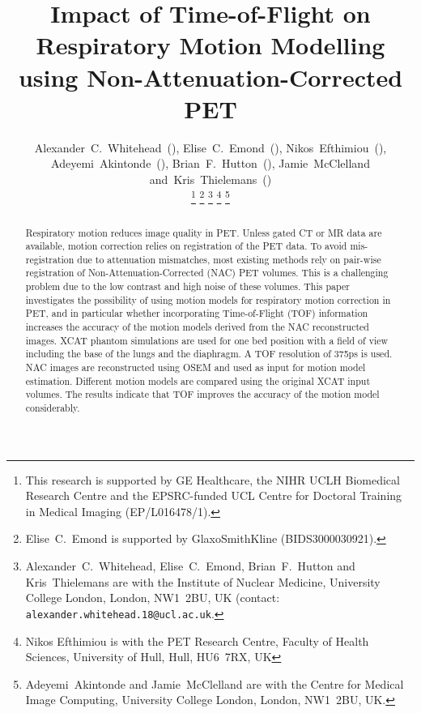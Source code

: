 \documentclass{IEEEtran}
\begin{document}
\title{Impact of Time-of-Flight on Respiratory Motion Modelling using Non-Attenuation-Corrected PET}

\author{Alexander~C.~Whitehead~(),
        Elise~C.~Emond~(),
        Nikos~Efthimiou~(),
        Adeyemi~Akintonde~(),
        Brian~F.~Hutton~(),
        Jamie~McClelland
        and~Kris~Thielemans~()%
        
    \vspace{-0.5cm}

    \thanks{This research is supported by GE Healthcare, the NIHR UCLH Biomedical Research Centre and the EPSRC-funded UCL Centre for Doctoral Training in Medical Imaging (EP/L016478/1).}%
    \thanks{Elise~C.~Emond is supported by GlaxoSmithKline (BIDS3000030921).}%
    \thanks{Alexander~C.~Whitehead, Elise~C.~Emond, Brian~F.~Hutton and Kris~Thielemans are with the Institute of Nuclear Medicine, University College London, London, NW1~2BU, UK (contact: \texttt{alexander.whitehead.18@ucl.ac.uk}.}%
    \thanks{Nikos Efthimiou is with the PET Research Centre, Faculty of Health Sciences, University of Hull, Hull, HU6~7RX, UK}%
    \thanks{Adeyemi~Akintonde and Jamie~McClelland are with the Centre for Medical Image Computing, University College London, London, NW1~2BU, UK.}%
}

\maketitle
\vspace{-1cm}

\IEEEpeerreviewmaketitle
\vspace{-1cm}

\begin{abstract}
    Respiratory motion reduces image quality in PET. Unless gated CT or MR data are available, motion correction relies on registration of the PET data. To avoid mis-registration due to attenuation mismatches, most existing methods rely on pair-wise registration of Non-Attenuation-Corrected (NAC) PET volumes. This is a challenging problem due to the low contrast and high noise of these volumes. This paper investigates the possibility of using motion models for respiratory motion correction in PET, and in particular whether incorporating Time-of-Flight (TOF) information increases the accuracy of the motion models derived from the NAC reconstructed images. XCAT phantom simulations are used for one bed position with a field of view including the base of the lungs and the diaphragm. A TOF resolution of 375ps is used. NAC images are reconstructed using OSEM and used as input for motion model estimation. Different motion models are compared using the original XCAT input volumes. The results indicate that TOF improves the accuracy of the motion model considerably.
\end{abstract}
\end{document}

